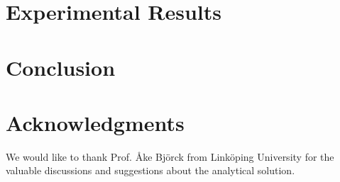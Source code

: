 \documentclass[conference]{IEEEtran}
\begin{document}
  \section{Experimental Results} \label{sec:results}
  

  \section{Conclusion} \label{sec:conclusion}
  

  \section{Acknowledgments}
  We would like to thank Prof. {\AA}ke Bj\"{o}rck from Link\"{o}ping University for the valuable discussions and suggestions about the analytical solution.

  
\end{document}
